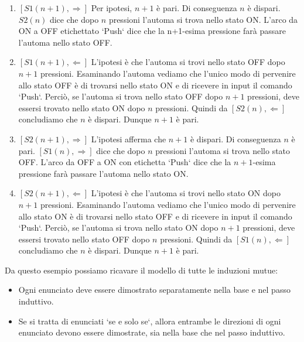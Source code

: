 		\begin{enumerate}
		  \item $[S1(n+1), \Rightarrow]$ Per ipotesi, $n+1$ \`e pari. Di conseguenza $n$ \`e
		  dispari.
		  $S2(n)$ dice che dopo $n$ pressioni l'automa si trova nello stato ON. L'arco
		  da ON a OFF etichettato `Push` dice che la n+1-esima pressione far\`a
		  passare l'automa nello stato OFF.
		  \item $[S1(n+1), \Leftarrow]$ L'ipotesi \`e che l'automa si trovi nello
		  stato OFF dopo $n+1$ pressioni. Esaminando l'automa vediamo che l'unico modo
		  di pervenire allo stato OFF \`e di trovarsi nello stato ON e di ricevere in
		  input il comando `Push`. Perci\`{o}, se l'automa si trova nello stato OFF dopo
		  $n+1$ pressioni, deve essersi trovato nello stato ON dopo $n$ pressioni.
		  Quindi da $[S2(n), \Leftarrow]$ concludiamo che $n$ \`{e} dispari. Dunque
		  $n+1$ \`e pari.
		  \item $[S2(n+1), \Rightarrow]$ L'ipotesi afferma che $n+1$ \`e dispari. Di conseguenza
		  $n$ \`e pari. $[S1(n), \Rightarrow]$ dice che dopo $n$ pressioni l'automa si trova
		  nello stato OFF. L'arco da OFF a ON con etichetta `Push` dice che la
		  $n+1$-esima pressione far\`a passare l'automa nello stato ON.
		  \item $[S2(n+1), \Leftarrow]$ L'ipotesi \`e che l'automa si trovi nello
		  stato ON dopo $n+1$ pressioni. Esaminando l'automa vediamo che l'unico modo
		  di pervenire allo stato ON \`e di trovarsi nello stato OFF e di ricevere in
		  input il comando `Push`. Perci\`{o}, se l'automa si trova nello stato ON dopo
		  $n+1$ pressioni, deve essersi trovato nello stato OFF dopo $n$ pressioni.
		  Quindi da $[S1(n), \Leftarrow]$ concludiamo che $n$ \`{e} dispari. Dunque
		  $n+1$ \`{e} pari.
		\end{enumerate}
		
		Da questo esempio possiamo ricavare il modello di tutte le induzioni mutue:
		
		\begin{itemize}
		  \item Ogni enunciato deve essere dimostrato separatamente nella base e nel
		  passo induttivo.
		  \item Se si tratta di enunciati `se e solo se`, allora entrambe le direzioni
		  di ogni enunciato devono essere dimostrate, sia nella base che nel passo
		  induttivo.
		\end{itemize}
		
		\newpage
		
